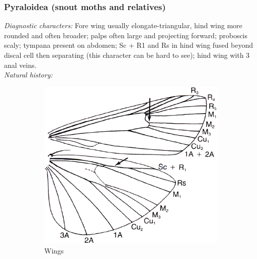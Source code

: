 \documentclass[letterpaper, 11pt]{article}
\begin{document}
\subsubsection{Pyraloidea (snout moths and relatives)}
\noindent{}\textit{Diagnostic characters:} Fore wing usually elongate-triangular, hind wing more rounded and often broader; palps often large and projecting forward; proboscis scaly; tympana present on abdomen; Sc + R1 and Rs in hind wing fused beyond discal cell then separating (this character can be hard to see); hind wing with 3 anal veins.\\

\noindent{}\textit{Natural history:} 


\begin{figure}[ht!]
    \centering
    \begin{subfigure}[ht!]{0.38\textwidth}
        \includegraphics[width=\textwidth]{image20}
        \caption{Wings}
        \label{fig:pyraloid1}
    \end{subfigure}
    \qquad %
    \begin{subfigure}[ht!]{0.48\textwidth}

\end{subfigure}
\end{figure}
\end{document}
